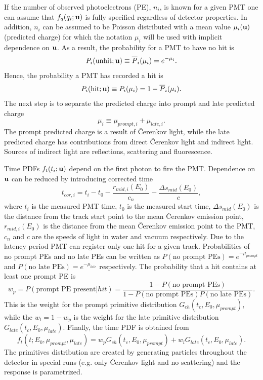 If the number of observed photoelectrons (PE), $n_i$, is known for a given PMT one can assume
that $f_q(q_i;{\bf u})$ is fully specified regardless of detector properties.
In addition, $n_i$ can be assumed to be Poisson distributed with a mean value
$\mu_i({\bf u})$ (predicted charge) for which the notation $\mu_i$ will be
used with implicit dependence on ${\bf u}$. As a result, the probability
for a PMT to have no hit is
\begin{equation}
	P_i(\text{unhit}; {\bf u})\equiv\overline P_i(\mu_i)=e^{-\mu_i}.
\end{equation}
Hence, the probability a PMT has recorded a hit is
\begin{equation}
	P_i(\text{hit}; {\bf u})\equiv P_i(\mu_i)=1-\overline P_i(\mu_i).
\end{equation}
The next step is to separate the predicted charge into prompt and late predicted charge
\begin{equation}
	\mu_i \equiv \mu_{prompt,i} + \mu_{late,i}.
\end{equation}
The prompt predicted charge is a result of \v{C}erenkov light, while the
late predicted charge has contributions from direct \v{C}erenkov light and
indirect light. Sources of indirect light are reflections, scattering and 
fluorescence.

Time PDFs $f_t(t_i;{\bf u})$ depend on the first photon to fire
the PMT. Dependence on ${\bf u}$ can be reduced by introducing
corrected time
\begin{equation}
	t_{cor,i}=t_i-t_0-\frac{r_{mid,i}(E_0)}{c_n}-\frac{\Delta s_{mid}(E_0)}{c},
\end{equation}
where $t_i$ is the measured PMT time, $t_0$ is the measured start time,
$\Delta s_{mid}(E_0)$ is the distance from the track start point to
the mean \v{C}erenkov emission point, $r_{mid,i}(E_0)$ is the distance
from the mean \v{C}erenkov emission point to the PMT, $c_n$ and $c$ are
the speeds of light in water and vacuum respectively. 
Due to the latency period PMT can register only one hit for a given track.
Probabilities of no prompt PEs and no late PEs can be written as
$P(\text{no prompt PEs}) = e^{-\mu_{prompt}}$ and $P(\text{no late PEs}) = e^{-\mu_{late}}$ 
respectively. The probability that a hit contains at least one prompt PE is
\begin{equation}
	w_p=P(\text{prompt PE present}|hit) =\frac{1-P(\text{no prompt PEs})}{1-P(\text{no prompt PEs})P(\text{no late PEs})}.
\end{equation}
This is the weight for the prompt primitive distribution $G_{ch}(t_c,E_0,\mu_{prompt})$, while the $w_l=1-w_p$ is the
weight for the late primitive distribution $G_{late}(t_c,E_0,\mu_{late})$. Finally, the time PDF is
obtained from
\begin{equation}
	f_t(t;E_0,\mu_{prompt},\mu_{late})=w_p G_{ch}(t_c,E_0,\mu_{prompt})+w_l G_{late}(t_c,E_0,\mu_{late}).
\end{equation}
The primitives distribution are created by generating particles throughout the detector in
special runs (e.g. only \v{C}erenkov light and no scattering) and the response is parametrized. 

